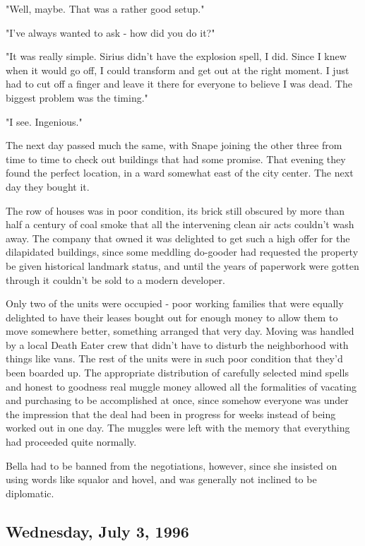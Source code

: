 \documentclass[a4paper,11pt]{article}
\begin{document}
"Well, maybe. That was a rather good setup."

"I've always wanted to ask - how did you do it?"

"It was really simple. Sirius didn't have the explosion spell, I did. Since I knew when it would go off, I could transform and get out at the right moment. I just had to cut off a finger and leave it there for everyone to believe I was dead. The biggest problem was the timing."

"I see. Ingenious."

The next day passed much the same, with Snape joining the other three from time to time to check out buildings that had some promise. That evening they found the perfect location, in a ward somewhat east of the city center. The next day they bought it.

The row of houses was in poor condition, its brick still obscured by more than half a century of coal smoke that all the intervening clean air acts couldn't wash away. The company that owned it was delighted to get such a high offer for the dilapidated buildings, since some meddling do-gooder had requested the property be given historical landmark status, and until the years of paperwork were gotten through it couldn't be sold to a modern developer.

Only two of the units were occupied - poor working families that were equally delighted to have their leases bought out for enough money to allow them to move somewhere better, something arranged that very day. Moving was handled by a local Death Eater crew that didn't have to disturb the neighborhood with things like vans. The rest of the units were in such poor condition that they'd been boarded up. The appropriate distribution of carefully selected mind spells and honest to goodness real muggle money allowed all the formalities of vacating and purchasing to be accomplished at once, since somehow everyone was under the impression that the deal had been in progress for weeks instead of being worked out in one day. The muggles were left with the memory that everything had proceeded quite normally.

Bella had to be banned from the negotiations, however, since she insisted on using words like squalor and hovel, and was generally not inclined to be diplomatic.

\subsection{Wednesday, July 3, 1996}
\end{document}
